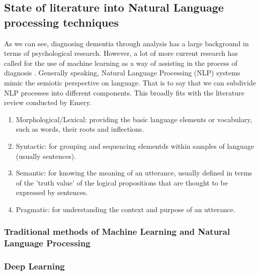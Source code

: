 \documentclass{article}
\begin{document}
\subsection{State of literature into Natural Language processing techniques}
As we can see, diagnosing dementia through analysis has a large background in terms of psychological research. However, a lot of more current research has called for the use of machine learning as a way of assisting in the process of diagnosis \cite{Boschi2017}. Generally speaking, Natural Language Processing (NLP) systems mimic the semiotic perspective on language. That is to say that we can subdivide NLP processes into different components. This broadly fits with the literature review conducted by Emery.
\begin{enumerate}
	\item Morphological/Lexical: providing the basic language elements or vocabulary, such as words, their roots and inflections.
	\item Syntactic: for grouping and sequencing elementds within samples of language (usually sentences).
	\item Semantic: for knowing the meaning of an utterance, usually defined in terms of the 'truth value' of the logical propositions that are thought to be expressed by sentences.
	\item Pragmatic: for understanding the context and purpose of an utterance.
\end{enumerate}
\subsubsection{Traditional methods of Machine Learning and Natural Language Processing}

\subsubsection{Deep Learning}
\end{document}
